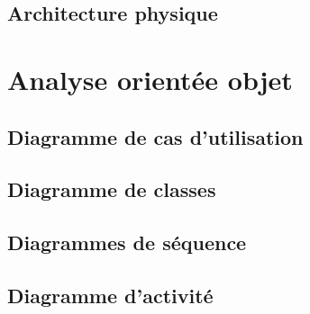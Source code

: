 \subsection{Architecture physique}


\section{Analyse orientée objet}


\subsection{Diagramme de cas d'utilisation}



\subsection{Diagramme de classes}



\subsection{Diagrammes de séquence}



\subsection{Diagramme d'activité}

